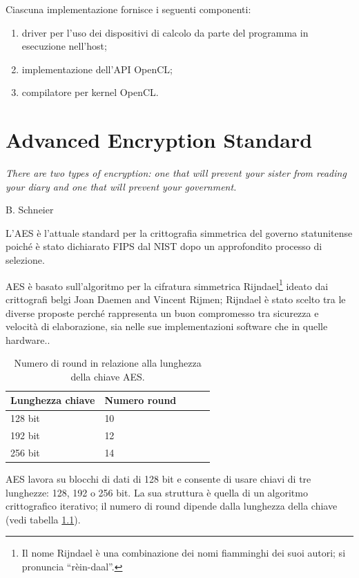 \documentclass[12pt,a4paper,oneside]{book}
\begin{document}
Ciascuna implementazione fornisce i seguenti componenti:
\begin{enumerate}
\item driver per l'uso dei dispositivi di calcolo da parte del programma in esecuzione nell'host;
\item implementazione dell'\ac{API} \ac{OpenCL};
\item compilatore per kernel \ac{OpenCL}.
\end{enumerate}

\chapter{Advanced Encryption Standard}
\label{cha:aes}
\linespread{1}
\epigraph{\textit{There are two types of encryption: one that will prevent your sister from reading your diary and one that will prevent your government. }}{B. Schneier}
\linespread{1.3}
L'\ac{AES} è l'attuale standard per la crittografia simmetrica del governo statunitense poiché è stato dichiarato \ac{FIPS} dal \ac{NIST} dopo un approfondito processo di selezione\cite{bib:fips-197}.

\ac{AES} è basato sull'algoritmo per la cifratura simmetrica Rijndael\footnote{Il nome Rijndael è una combinazione dei nomi fiamminghi dei suoi autori; si pronuncia ``rèin-daal''.} ideato dai crittografi belgi Joan Daemen and Vincent Rijmen; Rijndael è stato scelto tra le diverse proposte perché rappresenta un buon compromesso tra sicurezza e velocità di elaborazione, sia nelle sue implementazioni software che in quelle hardware.\cite{bib:aes-report}.

\begin{table}[h]
\begin{center}
\begin{tabular}{|l|l|l|l|l|}
\hline
\textbf{Lunghezza chiave} &  \textbf{Numero round} \\
\hline
128 bit & 10 \\
\hline
192 bit & 12 \\
\hline
256 bit & 14 \\
\hline
\end{tabular}
\caption{Numero di round in relazione alla lunghezza della chiave \ac{AES}.\label{tab:aes-rounds}}
\end{center}
\end{table}

\ac{AES} lavora su blocchi di dati di 128 bit e consente di usare chiavi di tre lunghezze: 128, 192 o 256 bit. La sua struttura è quella di un algoritmo crittografico iterativo; il numero di round dipende dalla lunghezza della chiave (vedi tabella \ref{tab:aes-rounds}).
\end{document}
